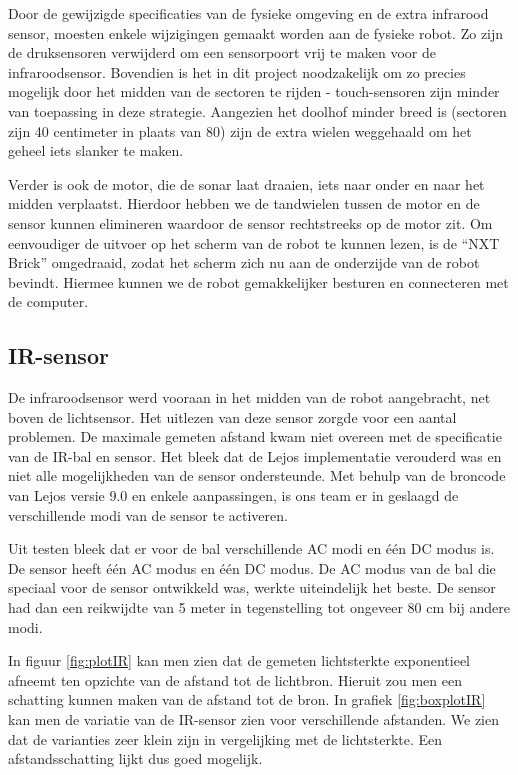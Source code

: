 \documentclass[12pt,a4paper]{report}
\begin{document}
Door de gewijzigde specificaties van de fysieke omgeving en de extra infrarood sensor, moesten enkele wijzigingen gemaakt worden aan de fysieke robot. Zo zijn de druksensoren verwijderd om een sensorpoort vrij te maken voor de infraroodsensor. Bovendien is het in dit project noodzakelijk om zo precies mogelijk door het midden van de sectoren te rijden - touch-sensoren zijn minder van toepassing in deze strategie. Aangezien het doolhof minder breed is (sectoren zijn 40 centimeter in plaats van 80) zijn de extra wielen weggehaald om het geheel iets slanker te maken.

Verder is ook de motor, die de sonar laat draaien, iets naar onder en naar het midden verplaatst. Hierdoor hebben we de tandwielen tussen de motor en de sensor kunnen elimineren waardoor de sensor rechtstreeks op de motor zit. Om eenvoudiger de uitvoer op het scherm van de robot te kunnen lezen, is de ``NXT Brick'' omgedraaid, zodat het scherm zich nu aan de onderzijde van de robot bevindt. Hiermee kunnen we de robot gemakkelijker besturen en connecteren met de computer.

\subsection{IR-sensor}

De infraroodsensor werd vooraan in het midden van de robot aangebracht, net boven de lichtsensor. Het uitlezen van deze sensor zorgde voor een aantal problemen. De maximale gemeten afstand kwam niet overeen met de specificatie van de IR-bal en sensor. Het bleek dat de Lejos implementatie verouderd was en niet alle mogelijkheden van de sensor ondersteunde. Met behulp van de broncode van Lejos versie 9.0 en enkele aanpassingen, is ons team er in geslaagd de verschillende modi van de sensor te activeren.

Uit testen bleek dat er voor de bal verschillende AC modi en \'e\'en DC modus is. De sensor heeft \'e\'en AC modus en \'e\'en DC modus. De AC modus van de bal die speciaal voor de sensor ontwikkeld was, werkte uiteindelijk het beste. De sensor had dan een reikwijdte van 5 meter in tegenstelling tot ongeveer 80 cm bij andere modi.

In figuur \ref{fig:plotIR} kan men zien dat de gemeten lichtsterkte exponentieel afneemt ten opzichte van de afstand tot de lichtbron.
Hieruit zou men een schatting kunnen maken van de afstand tot de bron. In grafiek \ref{fig:boxplotIR} kan men de variatie van de IR-sensor zien voor verschillende afstanden. We zien dat de varianties zeer klein zijn in vergelijking met de lichtsterkte. Een afstandsschatting lijkt dus goed mogelijk.
\end{document}
